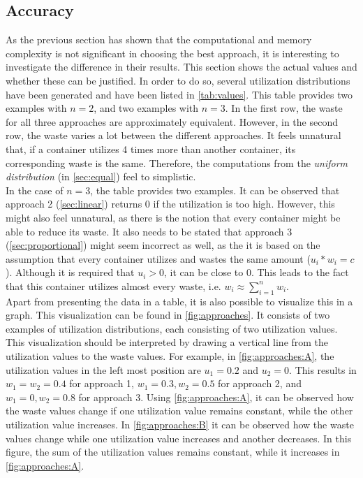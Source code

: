 \subsection{Accuracy} \label{sec:data}
As the previous section has shown that the computational and memory complexity is not significant in choosing the best approach, it is interesting to investigate the difference in their results. This section shows the actual values and whether these can be justified. In order to do so, several utilization distributions have been generated and have been listed in \autoref{tab:values}. This table provides two examples with $n = 2$, and two examples with $n = 3$. In the first row, the waste for all three approaches are approximately equivalent. However, in the second row, the waste varies a lot between the different approaches. It feels unnatural that, if a container utilizes 4 times more than another container, its corresponding waste is the same. Therefore, the computations from the \textit{uniform distribution} (in \autoref{sec:equal}) feel to simplistic.\\

\noindent
In the case of $n = 3$, the table provides two examples. It can be observed that approach 2 (\autoref{sec:linear}) returns $0$ if the utilization is too high. However, this might also feel unnatural, as there is the notion that every container might be able to reduce its waste. It also needs to be stated that approach 3 (\autoref{sec:proportional}) might seem incorrect as well, as the it is based on the assumption that every container utilizes and wastes the same amount ($u_i * w_i = c$). Although it is required that $u_i > 0$, it can be close to $0$. This leads to the fact that this container utilizes almost every waste, i.e. $w_i \approx \sum_{i=1}^n w_i$.\\

\noindent
Apart from presenting the data in a table, it is also possible to visualize this in a graph. This visualization can be found in \autoref{fig:approaches}. It consists of two examples of utilization distributions, each consisting of two utilization values. This visualization should be interpreted by drawing a vertical line from the utilization values to the waste values. For example, in \autoref{fig:approaches:A}, the utilization values in the left most position are $u_1 = 0.2$ and $u_2 = 0$. This results in $w_1 = w_2 = 0.4$ for approach 1, $w_1 = 0.3, w_2 = 0.5$ for approach 2, and $w_1 = 0, w_2 = 0.8$ for approach 3. Using \autoref{fig:approaches:A}, it can be observed how the waste values change if one utilization value remains constant, while the other utilization value increases. In \autoref{fig:approaches:B} it can be observed how the waste values change while one utilization value increases and another decreases. In this figure, the sum of the utilization values remains constant, while it increases in \autoref{fig:approaches:A}.\\


